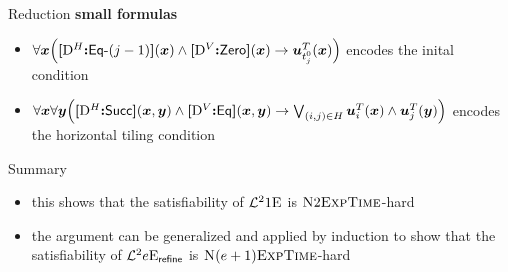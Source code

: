 \documentclass{beamer}
\begin{document}
\begin{frame}{Reduction}
\textbf{small formulas}
\begin{itemize}
  \item $\forall\bm{x} \Big({\bm{[}{\mathrm{D}}^H\mathord{\bm{:}}\mathsf{Eq}{\hbox{-}}(j-1)\bm{]}}(\bm{x}) \land {\bm{[}{\mathrm{D}}^V\mathord{\bm{:}}\mathsf{Zero}\bm{]}}(\bm{x})
  \rightarrow \bm{u}_{t_{j}^0}^{T}(\bm{x})\Big)$ encodes the inital condition
  \item $\forall\bm{x}\forall\bm{y} \Big({\bm{[}{\mathrm{D}}^H\mathord{\bm{:}}\mathsf{Succ}\bm{]}}(\bm{x},\bm{y}) \land
  {\bm{[}{\mathrm{D}}^V\mathord{\bm{:}}\mathsf{Eq}\bm{]}}(\bm{x},\bm{y}) \rightarrow
  \bigvee_{(i,j) \in H} \bm{u}_{i}^{T}(\bm{x}) \land
  \bm{u}_{j}^{T}(\bm{y})\Big)$ encodes the horizontal tiling condition
\end{itemize}
\end{frame}

\begin{frame}{Summary}
\begin{itemize}
  \item
  this shows that the satisfiability of $\mathcal{L}^{2}{1}\mathrm{E}_{{}}$ is $\text{\normalfont{\scshape N}}2\text{\normalfont{\scshape ExpTime}}$-hard
  
  \item
  the argument can be generalized and applied by induction to show that 
  the satisfiability of $\mathcal{L}^{2}{e}\mathrm{E}_{\mathsf{refine}}$ is $\text{\normalfont{\scshape N}}(e+1)\text{\normalfont{\scshape ExpTime}}$-hard
\end{itemize}
\end{frame}
\end{document}
